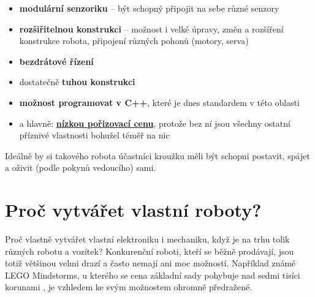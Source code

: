 \documentclass{template/socthesis}
\begin{document}
\begin{itemize}
	\item \textbf{modulární senzoriku} -- být schopný připojit na sebe různé senzory 
	
	\item \textbf{rozšiřitelnou konstrukci} -- možnost i velké úpravy, změn a rozšíření konstrukce robota, připojení různých pohonů (motory, serva)
	
	\item \textbf{bezdrátové řízení}
	
	\item dostatečně \textbf{tuhou konstrukci}
	
	\item  \textbf{možnost programovat v C++}, které je dnes standardem v této oblasti
	
	\item a hlavně: \underline{\textbf{nízkou pořizovací cenu}}, protože bez ní jsou všechny ostatní příznivé vlastnosti bohužel téměř na nic 
	
\end{itemize}

Ideálně by si takového robota účastníci kroužku měli být schopni postavit, spájet a oživit (podle pokynů vedoucího) sami. 





\newpage

\chapter{Proč vytvářet vlastní roboty?}

Proč vlastně vytvářet vlastní elektroniku i mechaniku, když je na trhu tolik různých robotu a vozítek? Konkurenční roboti, kteří se běžně prodávají, jsou totiž většinou velmi drazí a často nemají ani moc možností. Například známé LEGO Mindstorms, u kterého se cena základní sady pohybuje nad sedmi tisíci korunami \cite{lego_cena},
 je vzhledem ke svým možnostem ohromně předražené.
 
\end{document}

